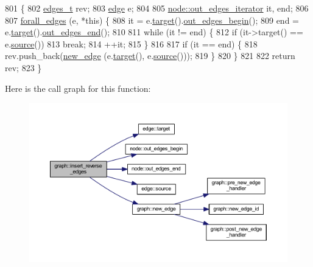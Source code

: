 \begin{DoxyCode}
801                                     \{
802     \mbox{\hyperlink{edge_8h_a8f9587479bda6cf612c103494b3858e3}{edges\_t}} rev;
803     \mbox{\hyperlink{classedge}{edge}} e;
804 
805     \mbox{\hyperlink{classnode_a90e17ed34de55072e8077f4367499a98}{node::out\_edges\_iterator}} it, end;
806 
807     \mbox{\hyperlink{graph_8h_ac57b09543204dcb7a1e2c76c793cf038}{forall\_edges}} (e, *\textcolor{keyword}{this}) \{
808     it = e.\mbox{\hyperlink{classedge_a97563b611261478ee19c6ce055f1a3ee}{target}}().\mbox{\hyperlink{classnode_a7dcb80df22118cea04f77ca8c952d9c2}{out\_edges\_begin}}();
809     end = e.\mbox{\hyperlink{classedge_a97563b611261478ee19c6ce055f1a3ee}{target}}().\mbox{\hyperlink{classnode_a7ce2ba5195a63d4df6b44299a02a9378}{out\_edges\_end}}();
810 
811     \textcolor{keywordflow}{while} (it != end) \{
812         \textcolor{keywordflow}{if} (it->target() == e.\mbox{\hyperlink{classedge_ae82d5701f7e6f71edc3c8b0e34bcd2b7}{source}}()) 
813         \textcolor{keywordflow}{break};
814         ++it;
815     \}
816     
817     \textcolor{keywordflow}{if} (it == end) \{
818         rev.push\_back(\mbox{\hyperlink{classgraph_a02a0c3a219f75d68caa408ef339d4a1c}{new\_edge}} (e.\mbox{\hyperlink{classedge_a97563b611261478ee19c6ce055f1a3ee}{target}}(), e.\mbox{\hyperlink{classedge_ae82d5701f7e6f71edc3c8b0e34bcd2b7}{source}}()));
819     \}
820     \}
821 
822     \textcolor{keywordflow}{return} rev;
823 \}
\end{DoxyCode}
Here is the call graph for this function\+:
\nopagebreak
\begin{figure}[H]
\begin{center}
\leavevmode
\includegraphics[width=350pt]{classgraph_a1085478258cf370dcfbe283e834df339_cgraph}
\end{center}
\end{figure}
\mbox{\label{classgraph_a9b500cb72826fe5bbefa8c71bc4642fa}} 
